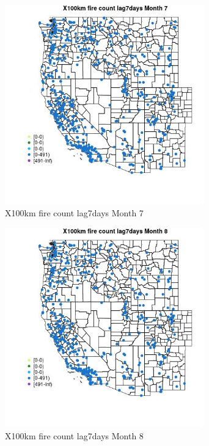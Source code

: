 \begin{figure} 
\centering  
\includegraphics[width=0.77\textwidth]{Code_Outputs/Report_ML_input_PM25_Step4_part_e_de_duplicated_aves_compiled_2019-05-14wNAs_MapObsMo7X100km_fire_count_lag7days.jpg} 
\caption{\label{fig:Report_ML_input_PM25_Step4_part_e_de_duplicated_aves_compiled_2019-05-14wNAsMapObsMo7X100km_fire_count_lag7days}X100km fire count lag7days Month 7} 
\end{figure} 
 

\begin{figure} 
\centering  
\includegraphics[width=0.77\textwidth]{Code_Outputs/Report_ML_input_PM25_Step4_part_e_de_duplicated_aves_compiled_2019-05-14wNAs_MapObsMo8X100km_fire_count_lag7days.jpg} 
\caption{\label{fig:Report_ML_input_PM25_Step4_part_e_de_duplicated_aves_compiled_2019-05-14wNAsMapObsMo8X100km_fire_count_lag7days}X100km fire count lag7days Month 8} 
\end{figure} 
 

